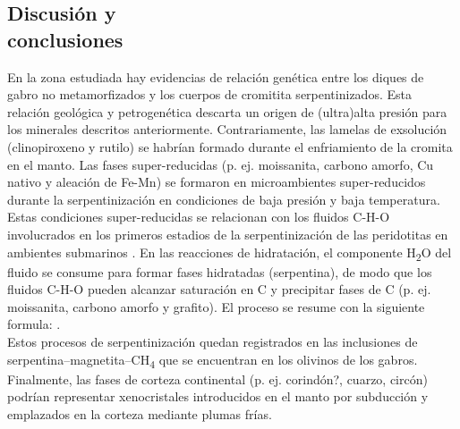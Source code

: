 \documentclass[a4paper,11pt]{article}
\begin{document}
\begin{multicols}{2}	
		\section{Discusión y \\conclusiones}
		En la zona estudiada hay evidencias de relación genética entre los diques de gabro no metamorfizados y los cuerpos de cromitita serpentinizados. Esta relación geológica y petrogenética descarta un origen de (ultra)alta presión para los minerales descritos anteriormente. Contrariamente, las lamelas de exsolución (clinopiroxeno y rutilo) se habrían formado durante el enfriamiento de la cromita en el manto. Las fases super-reducidas (p. ej. moissanita, carbono amorfo, Cu nativo y aleación de Fe-Mn) se formaron en microambientes super-reducidos durante la serpentinización en condiciones de baja presión y baja temperatura. Estas condiciones super-reducidas se relacionan con los fluidos C-H-O involucrados en los primeros estadios de la serpentinización de las peridotitas en ambientes submarinos \cite{Golubkova}. En las reacciones de hidratación, el componente H\textsubscript{2}O del fluido se consume para formar fases hidratadas (serpentina), de modo que los fluidos C-H-O pueden alcanzar saturación en C y precipitar fases de C (p. ej. moissanita, carbono amorfo y grafito). El proceso se resume con la siguiente formula:
		 \cite{Golubkova}.
		\\Estos procesos de serpentinización quedan registrados en las inclusiones de serpentina–magnetita–CH\textsubscript{4} que se encuentran en los olivinos de los gabros. Finalmente, las fases de corteza continental (p. ej. corindón?, cuarzo, circón) podrían representar xenocristales introducidos en el manto por subducción y emplazados en la corteza mediante plumas frías.
	\end{multicols}
	
	
	
	
\end{document}
